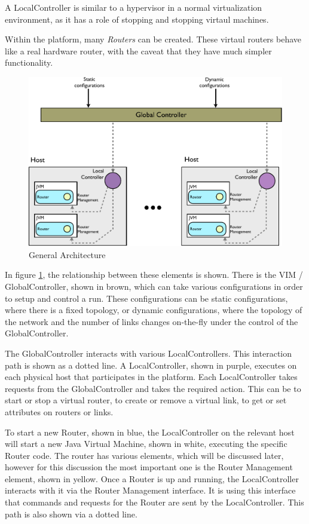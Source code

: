 \noindent A LocalController is similar to a hypervisor in a normal
virtualization environment, as it has a role of stopping and stopping
virtaul machines.

Within the platform, many \emph{Routers} can be created.  These
virtaul routers behave like a real hardware router, with the caveat
that they have much simpler functionality.

\begin{figure}
    \centering
    \includegraphics[width=13cm]{images/architecture}
    \caption{General Architecture}
    \label{usr-architecture}
\end{figure}

In figure \ref{usr-architecture}, the relationship between these
elements is shown. There is the VIM / GlobalController, shown in brown, which can take
various configurations in order to setup and control a run.  These
configurations can be static configurations, where there is a fixed
topology, or dynamic configurations, where the topology of the network
and the number of links changes on-the-fly under the control of the
GlobalController.

The GlobalController interacts with various LocalControllers.  This
interaction path is shown as a dotted line.  A LocalController,
shown in purple,
executes on each physical host that participates in the platform.
Each LocalController takes requests from the GlobalController and
takes the required action.  This can be to start or stop a virtual
router, to create or remove a virtual link, to get or set attributes
on routers or links.

To start a new Router, shown in blue, the LocalController on the
relevant host will start a new Java Virtual Machine, shown in white,
executing the specific Router code.  The router has various elements,
which will be discussed later, however for this discussion the most
important one is the Router Management element, shown in yellow.  Once
a Router is up and running, the LocalController interacts with it via
the Router Management interface.  It is using this interface that
commands and requests for the Router are sent by the
LocalController. This path is also shown via a dotted line.


